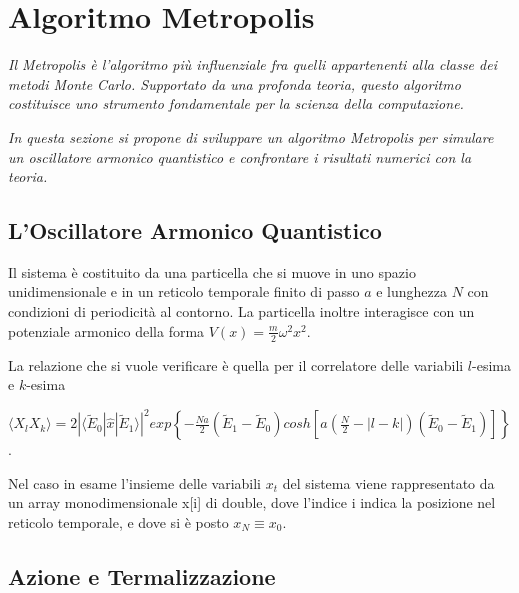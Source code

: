 \chapter{\huge Algoritmo Metropolis}

\textit{Il Metropolis è l'algoritmo più influenziale fra quelli appartenenti alla classe dei metodi Monte Carlo. Supportato da una profonda teoria, questo algoritmo costituisce uno strumento fondamentale per la scienza della computazione.}

\textit{In questa sezione si propone di sviluppare un algoritmo Metropolis per simulare un oscillatore armonico quantistico e confrontare i risultati numerici con la teoria.}

\section{L'Oscillatore Armonico Quantistico}
Il sistema è costituito da una particella che si muove in uno spazio unidimensionale e in un reticolo temporale finito di passo $a$ e lunghezza $N$ con condizioni di periodicità al contorno. La particella inoltre interagisce con un potenziale armonico della forma $V(x) = \frac{m}{2}\omega^2 x^2$.

La relazione che si vuole verificare è quella per il correlatore delle variabili $l$-esima e $k$-esima
\begin{center}
\small
$\langle X_l X_k\rangle = 2|\langle\tilde{E}_0|\hat{x}|\tilde{E}_1\rangle|^2 exp\left\{-\frac{Na}{2}(\tilde{E}_1-\tilde{E}_0)cosh\left[a\left(\frac{N}{2}-|l-k|\right)(\tilde{E}_0-\tilde{E}_1)\right]\right\}$.
\end{center}
Nel caso in esame l'insieme delle variabili $x_t$ del sistema viene rappresentato da un array monodimensionale {\ttfamily x[i]} di {\ttfamily double}, dove l'indice {\ttfamily i} indica la posizione nel reticolo temporale, e dove si è posto $x_N \equiv x_0$.
\section{Azione e Termalizzazione}

